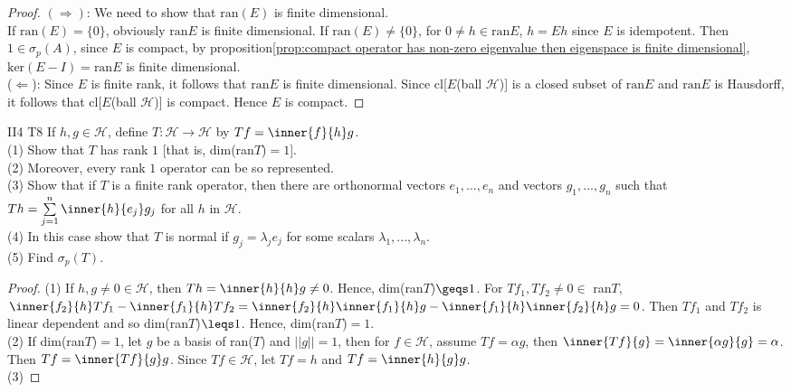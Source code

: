 \begin{proof}
    $(\Rightarrow)$:
    We need to show that $\text{ran}(E)$ is finite dimensional.\\
    If $\text{ran}(E)=\{0\}$, obviously $\text{ran}E$ is finite dimensional.
    If $\text{ran}(E)\neq \{0\}$, for $0\neq h\in\text{ran}E$, $h=Eh$ since $E$ is idempotent.
    Then $1\in\sigma_p(A)$, since $E$ is compact, by proposition\ref{prop:compact operator has non-zero eigenvalue then eigenspace is finite dimensional},
    $\text{ker}(E-I)=\text{ran}E$ is finite dimensional. \\
    ($\Leftarrow$):
    Since $E$ is finite rank, it follows that $\text{ran}E$ is finite dimensional.
    Since cl[$E$(ball $\mathscr{H}$)] is a closed subset of $\text{ran}E$ 
    and $\text{ran}E$ is Hausdorff,
    it follows that cl[$E$(ball $\mathscr{H}$)] is compact. Hence $E$ is compact.
\end{proof}

\begin{exercise}{II4 T8}{}
    If $h,g\in\mathscr{H}$,
    define $T:\mathscr{H}\rightarrow \mathscr{H}$ by $Tf=\inner{f}{h}g$.\\
    (1) Show that $T$ has rank $1$ [that is, dim(ran$T$)$=1$].\\
    (2) Moreover, every rank $1$ operator can be so represented.\\
    (3) Show that if $T$ is a finite rank operator, then there are orthonormal vectors
    $e_1,...,e_n$ and vectors $g_1,...,g_n$ such that $Th=\sum\limits_{j=1}^{n}\inner{h}{e_j}g_j$
    for all $h$ in $\mathscr{H}$. \\
    (4)  In this case show that
    $T$ is normal if $g_j=\lambda_je_j$ for some scalars $\lambda_1,...,\lambda_n$.\\
    (5) Find $\sigma_p(T)$.
\end{exercise}

\begin{proof}
    (1) If $h,g\neq 0\in\mathscr{H}$, then $Th=\inner{h}{h}g\neq 0$. Hence, dim(ran$T$)$\geqs 1$.
    For $Tf_1,Tf_2\neq 0\in$ ran$T$, $\inner{f_2}{h}Tf_1-\inner{f_1}{h}Tf_2=\inner{f_2}{h}\inner{f_1}{h}g-\inner{f_1}{h}\inner{f_2}{h}g=0$.
    Then $Tf_1$ and $Tf_2$ is linear dependent and so dim(ran$T$)$\leqs 1$.
    Hence, dim(ran$T$)$=1$.\\
    (2) If dim(ran$T$)$=1$, let $g$ be a basis of ran($T$) and $||g||=1$, then for $f\in\mathscr{H}$,
    assume $Tf=\alpha g$, then $\inner{Tf}{g}=\inner{\alpha g}{g}=\alpha$. Then $Tf=\inner{Tf}{g}g$. 
    Since $Tf\in\mathscr{H}$, let $Tf=h$ and $Tf=\inner{h}{g}g$.\\
    (3) 
\end{proof}

